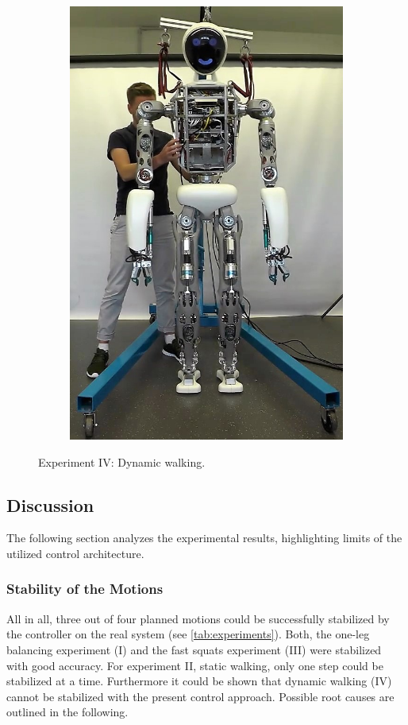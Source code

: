 \begin{figure}[h!]
\begin{subfigure}{.2\textwidth}
	\includegraphics[width=.95\linewidth]{experiments/walkDynamic/snaps/5}
	\end{subfigure}%
\caption[Experiment IV: Dynamic walking]{Experiment IV: Dynamic walking.}
\label{exp:dynamicWalkingSnaps}
\end{figure} 

\subsection{Discussion}
The following section analyzes the experimental results, highlighting limits of the utilized control architecture.
\subsubsection{Stability of the Motions}
All in all, three out of four planned motions could be successfully stabilized by the  controller on the real system (see \cref{tab:experiments}). Both, the one-leg balancing experiment (I) and the fast squats experiment (III) were stabilized with good accuracy. For experiment II, static walking, only one step could be stabilized at a time. Furthermore it could be shown that dynamic walking (IV) cannot be stabilized with the present control approach. Possible root causes are outlined in the following. 
